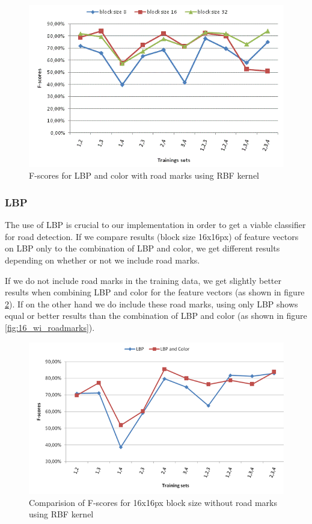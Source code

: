 \documentclass[runningheads,a4paper]{llncs}
\begin{document}
\begin{figure}
\centering
\includegraphics[width=\textwidth]{fig/RBF_LBP_Col_wi_RM.png}
\caption{F-scores for LBP and color with road marks using RBF kernel}
\label{fig:lbp-col-wi-rm}
\end{figure}

\subsubsection{LBP}
The use of LBP is crucial to our implementation in order to get a viable classifier for road detection. If we compare results (block size 16x16px) of feature vectors on LBP only to the combination of LBP and color, we get different results depending on whether or not we include road marks. 

If we do not include road marks in the training data, we get slightly better results when combining LBP and color for the feature vectors (as shown in figure \ref{fig:16_wo_roadmarks}).
If on the other hand we do include these road marks, using only LBP shows equal or better results than the combination of LBP and color (as shown in figure \ref{fig:16_wi_roadmarks}). 

\begin{figure}[h]
\centering
\includegraphics[width=\textwidth]{fig/16_wo_roadmarks.png}
\caption{Comparision of F-scores for 16x16px block size without road marks using RBF kernel }
\label{fig:16_wo_roadmarks}
\end{figure}
\end{document}
